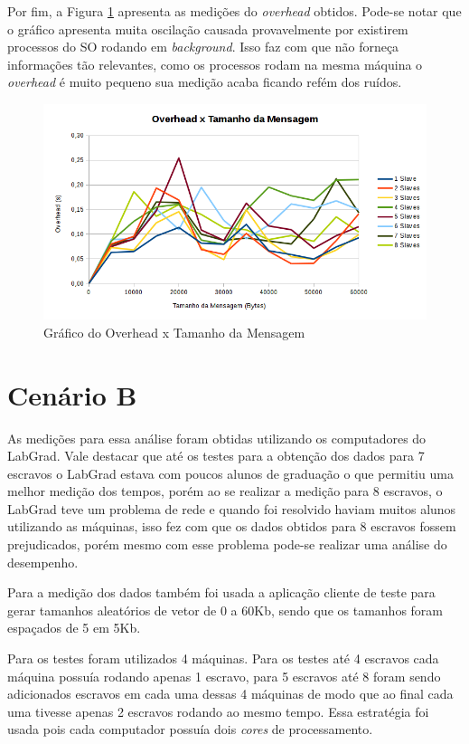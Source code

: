 \documentclass[
	12pt,				%
    oneside,			%
	a4paper,			%
	english,			%
	brazil,				%
	]{abntex2}
\begin{document}
Por fim, a Figura \ref{fig:cent:overheadXtamanho_msg} apresenta as medições do \textit{overhead} obtidos. Pode-se notar que 
o gráfico apresenta muita oscilação causada provavelmente por existirem processos do SO rodando em \textit{background}. Isso
faz com que não forneça informações tão relevantes, como os processos rodam na mesma máquina o \textit{overhead} é muito
pequeno sua medição acaba ficando refém dos ruídos.

\begin{figure}[!htb]
\centering
\includegraphics[scale=0.65]{figuras/overhead_centralizado.png}
\caption{Gráfico do Overhead x Tamanho da Mensagem}
\label{fig:cent:overheadXtamanho_msg}
\end{figure}


\section{Cenário B}

As medições para essa análise foram obtidas utilizando os computadores do LabGrad. Vale destacar que até os testes para a 
obtenção dos dados para 7 escravos o LabGrad estava com poucos alunos de graduação o que permitiu uma melhor medição dos tempos, porém ao se realizar a medição para 8 escravos, o LabGrad teve um problema de rede e quando foi resolvido haviam muitos alunos utilizando as máquinas, isso fez com que os dados obtidos para 8 escravos fossem prejudicados, porém mesmo com esse problema pode-se realizar uma análise do desempenho.

Para a medição dos dados também foi usada a aplicação cliente de teste para gerar tamanhos aleatórios de vetor de 0 a 60Kb,
sendo que os tamanhos foram espaçados de 5 em 5Kb.

Para os testes foram utilizados 4 máquinas. Para os testes até 4 escravos cada máquina possuía rodando apenas 1 escravo, para 5 escravos até 8 foram sendo adicionados escravos em cada uma dessas 4 máquinas de modo que ao final cada uma tivesse apenas 2
escravos rodando ao mesmo tempo. Essa estratégia foi usada pois cada computador possuía dois \textit{cores} de processamento.
\end{document}
